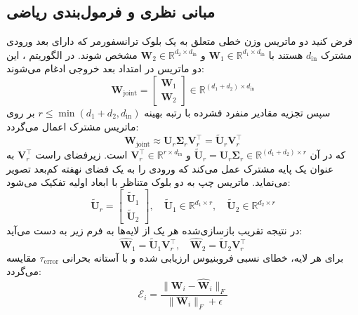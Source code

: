 \subsection{مبانی نظری و فرمول‌بندی ریاضی}
فرض کنید دو ماتریس وزن خطی متعلق به یک بلوک ترانسفورمر که دارای بعد ورودی مشترک $d_{\text{in}}$ هستند با $\mathbf{W}_1 \in \mathbb{R}^{d_1 \times d_{\text{in}}}$ و $\mathbf{W}_2 \in \mathbb{R}^{d_2 \times d_{\text{in}}}$ مشخص شوند. در الگوریتم ، این دو ماتریس در امتداد بعد خروجی ادغام می‌شوند:
\begin{equation}
\mathbf{W}_{\text{joint}} = \begin{bmatrix} \mathbf{W}_1 \\ \mathbf{W}_2 \end{bmatrix} \in \mathbb{R}^{(d_1 + d_2) \times d_{\text{in}}}
\end{equation}
سپس تجزیه مقادیر منفرد فشرده با رتبه بهینه $r \le \min(d_1 + d_2, d_{\text{in}})$ بر روی ماتریس مشترک اعمال می‌گردد:
\begin{equation}
\mathbf{W}_{\text{joint}} \approx \mathbf{U}_r \mathbf{\Sigma}_r \mathbf{V}_r^\top = \tilde{\mathbf{U}}_r \mathbf{V}_r^\top
\end{equation}
که در آن $\tilde{\mathbf{U}}_r = \mathbf{U}_r \mathbf{\Sigma}_r \in \mathbb{R}^{(d_1 + d_2) \times r}$ و $\mathbf{V}_r^\top \in \mathbb{R}^{r \times d_{\text{in}}}$ است. زیرفضای راست $\mathbf{V}_r^\top$ به عنوان یک پایه مشترک عمل می‌کند که ورودی را به یک فضای نهفته کم‌بعد تصویر می‌نماید. ماتریس چپ به دو بلوک متناظر با ابعاد اولیه تفکیک می‌شود:
\begin{equation}
\tilde{\mathbf{U}}_r = \begin{bmatrix} \tilde{\mathbf{U}}_1 \\ \tilde{\mathbf{U}}_2 \end{bmatrix}, \quad \tilde{\mathbf{U}}_1 \in \mathbb{R}^{d_1 \times r}, \quad \tilde{\mathbf{U}}_2 \in \mathbb{R}^{d_2 \times r}
\end{equation}
در نتیجه تقریب بازسازی‌شده هر یک از لایه‌ها به فرم زیر به دست می‌آید:
\begin{equation}
\hat{\mathbf{W}}_1 = \tilde{\mathbf{U}}_1 \mathbf{V}_r^\top, \quad \hat{\mathbf{W}}_2 = \tilde{\mathbf{U}}_2 \mathbf{V}_r^\top
\end{equation}
برای هر لایه، خطای نسبی فروبنیوس ارزیابی شده و با آستانه بحرانی $\tau_{\text{error}}$ مقایسه می‌گردد:
\begin{equation}
\mathcal{E}_i = \frac{\|\mathbf{W}_i - \hat{\mathbf{W}}_i\|_F}{\|\mathbf{W}_i\|_F + \epsilon}
\end{equation}

